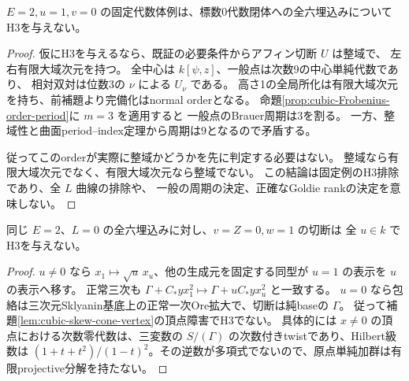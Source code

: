\begin{theorem}[固定正常三次例のH3排除]
\label{thm:cubic-third-root-unit-boundary-L-fixed-no-H3}
$E=2,u=1,v=0$ の固定代数体例は、標数0代数閉体への全六埋込みについてH3を与えない。
\end{theorem}
\begin{proof}
仮にH3を与えるなら、既証の必要条件からアフィン切断 $U$ は整域で、
左右有限大域次元を持つ。
全中心は $k[\psi,z]$、一般点は次数9の中心単純代数であり、
相対双対は位数3の $\nu$ による $U_\nu$ である。
高さ1の全局所化は有限大域次元を持ち、前補題より完備化はnormal orderとなる。
命題\ref{prop:cubic-Frobenius-order-period}に $m=3$ を適用すると
一般点のBrauer周期は3を割る。
一方、整域性と曲面period--index定理から周期は9となるので矛盾する。

従ってこのorderが実際に整域かどうかを先に判定する必要はない。
整域なら有限大域次元でなく、有限大域次元なら整域でない。
この結論は固定例のH3排除であり、全 $L$ 曲線の排除や、
一般の周期の決定、正確なGoldie rankの決定を意味しない。
\end{proof}

\begin{corollary}[$v=0$ の全 $u$]
同じ $E=2$、$L=0$ の全六埋込みに対し、$v=Z=0,w=1$ の切断は
全 $u\in k$ でH3を与えない。
\end{corollary}
\begin{proof}
$u\ne0$ なら $x_1\mapsto\sqrt{u}\,x_u$、他の生成元を固定する同型が
$u=1$ の表示を $u$ の表示へ移す。
正常三次も $\Gamma+C_*yx_1^2\mapsto\Gamma+uC_*yx_u^2$ と一致する。
$u=0$ なら包絡は三次元Sklyanin基底上の正常一次Ore拡大で、切断は純baseの $\Gamma$。
従って補題\ref{lem:cubic-skew-cone-vertex}の頂点障害でH3でない。
具体的には $x\ne0$ の頂点における次数零代数は、三変数の
$S/(\Gamma)$ の次数付きtwistであり、Hilbert級数は
$(1+t+t^2)/(1-t)^2$。その逆数が多項式でないので、原点単純加群は有限projective分解を持たない。
\end{proof}
